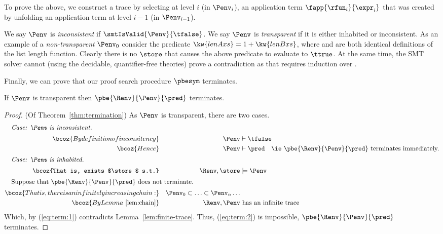 To prove the above,
we construct a trace
by selecting at level $i$
(\ie in $\Penv_i$),
an application term
$\fapp{\rfun_i}{\expr_i}$
that was created by
unfolding an application
term at level $i-1$
(\ie in $\Penv_{i-1}$).


%
We say $\Penv$ is \emph{inconsistent}
if $\smtIsValid{\Penv}{\tfalse}$.
%
We say $\Penv$ is \emph{transparent}
if it is either inhabited or inconsistent.
%
As an example of a \emph{non-transparent}
$\Penv_0$ consider the predicate
$\kw{lenA xs} = 1 + \kw{lenB xs}$,
where  and  are both
identical definitions of the list length
function.
%
Clearly there is no $\store$ that causes
the above predicate to evaluate to $\ttrue$.
%
At the same time, the SMT solver cannot
(using the decidable, quantifier-free theories)
prove a contradiction as that requires
induction over .


%
Finally, we can prove that our proof search
procedure $\pbesym$ terminates.

\begin{theorem} \label{thm:termination}
  If $\Penv$ is transparent
  then $\pbe{\Renv}{\Penv}{\pred}$ terminates.
\end{theorem}


\begin{proof} (Of Theorem~\ref{thm:termination})
As $\Penv$ is transparent, there are two cases.
%
\begin{alignat}{3}
%
\intertext{\quad \emph{Case: $\Penv$ is inconsistent.}}
%
\bcoz{By definition of inconsitency}
  && \Penv & \vdash \tfalse \notag \\
\bcoz{Hence}
  && \Penv & \vdash \pred \quad \mbox{\ie $\pbe{\Renv}{\Penv}{\pred}$ terminates immediately.}
     \notag \\%
%
\intertext{\quad \emph{Case: $\Penv$ is inhabited.}}
%
\bcoz{That is, exists $\store$ s.t.}
  && \Renv, \store & \models \Penv \label{eq:term:1} \\
\intertext{\quad Suppose that $\pbe{\Renv}{\Penv}{\pred}$ does not terminate.}
\bcoz{That is, there is an infinitely increasing chain:}
  && \Penv_0 \subset \ldots \subset \Penv_n \ldots
  \label{eq:term:2} \\
\bcoz{By Lemma~\ref{lem:chain}}
  && \Renv,\Penv & \ \mbox{has an infinite trace} \notag
\end{alignat}
Which, by (\ref{eq:term:1}) contradicts Lemma~\ref{lem:finite-trace}.
Thus, (\ref{eq:term:2}) is impossible, \ie $\pbe{\Renv}{\Penv}{\pred}$
terminates.
\end{proof}
